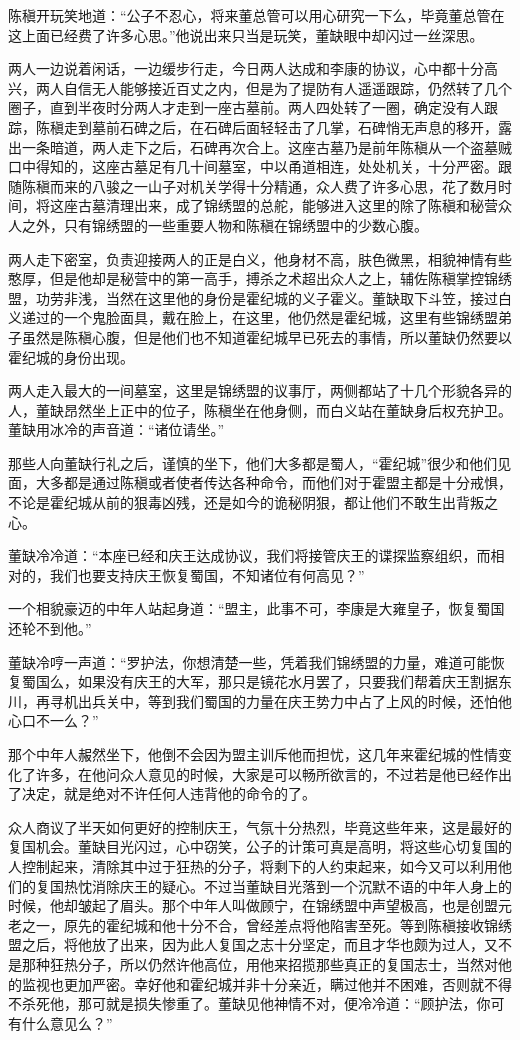 陈稹开玩笑地道：“公子不忍心，将来董总管可以用心研究一下么，毕竟董总管在这上面已经费了许多心思。”他说出来只当是玩笑，董缺眼中却闪过一丝深思。

两人一边说着闲话，一边缓步行走，今日两人达成和李康的协议，心中都十分高兴，两人自信无人能够接近百丈之内，但是为了提防有人遥遥跟踪，仍然转了几个圈子，直到半夜时分两人才走到一座古墓前。两人四处转了一圈，确定没有人跟踪，陈稹走到墓前石碑之后，在石碑后面轻轻击了几掌，石碑悄无声息的移开，露出一条暗道，两人走下之后，石碑再次合上。这座古墓乃是前年陈稹从一个盗墓贼口中得知的，这座古墓足有几十间墓室，中以甬道相连，处处机关，十分严密。跟随陈稹而来的八骏之一山子对机关学得十分精通，众人费了许多心思，花了数月时间，将这座古墓清理出来，成了锦绣盟的总舵，能够进入这里的除了陈稹和秘营众人之外，只有锦绣盟的一些重要人物和陈稹在锦绣盟中的少数心腹。

两人走下密室，负责迎接两人的正是白义，他身材不高，肤色微黑，相貌神情有些憨厚，但是他却是秘营中的第一高手，搏杀之术超出众人之上，辅佐陈稹掌控锦绣盟，功劳非浅，当然在这里他的身份是霍纪城的义子霍义。董缺取下斗笠，接过白义递过的一个鬼脸面具，戴在脸上，在这里，他仍然是霍纪城，这里有些锦绣盟弟子虽然是陈稹心腹，但是他们也不知道霍纪城早已死去的事情，所以董缺仍然要以霍纪城的身份出现。

两人走入最大的一间墓室，这里是锦绣盟的议事厅，两侧都站了十几个形貌各异的人，董缺昂然坐上正中的位子，陈稹坐在他身侧，而白义站在董缺身后权充护卫。董缺用冰冷的声音道：“诸位请坐。”

那些人向董缺行礼之后，谨慎的坐下，他们大多都是蜀人，“霍纪城”很少和他们见面，大多都是通过陈稹或者使者传达各种命令，而他们对于霍盟主都是十分戒惧，不论是霍纪城从前的狠毒凶残，还是如今的诡秘阴狠，都让他们不敢生出背叛之心。

董缺冷冷道：“本座已经和庆王达成协议，我们将接管庆王的谍探监察组织，而相对的，我们也要支持庆王恢复蜀国，不知诸位有何高见？”

一个相貌豪迈的中年人站起身道：“盟主，此事不可，李康是大雍皇子，恢复蜀国还轮不到他。”

董缺冷哼一声道：“罗护法，你想清楚一些，凭着我们锦绣盟的力量，难道可能恢复蜀国么，如果没有庆王的大军，那只是镜花水月罢了，只要我们帮着庆王割据东川，再寻机出兵关中，等到我们蜀国的力量在庆王势力中占了上风的时候，还怕他心口不一么？”

那个中年人赧然坐下，他倒不会因为盟主训斥他而担忧，这几年来霍纪城的性情变化了许多，在他问众人意见的时候，大家是可以畅所欲言的，不过若是他已经作出了决定，就是绝对不许任何人违背他的命令的了。

众人商议了半天如何更好的控制庆王，气氛十分热烈，毕竟这些年来，这是最好的复国机会。董缺目光闪过，心中窃笑，公子的计策可真是高明，将这些心切复国的人控制起来，清除其中过于狂热的分子，将剩下的人约束起来，如今又可以利用他们的复国热忱消除庆王的疑心。不过当董缺目光落到一个沉默不语的中年人身上的时候，他却皱起了眉头。那个中年人叫做顾宁，在锦绣盟中声望极高，也是创盟元老之一，原先的霍纪城和他十分不合，曾经差点将他陷害至死。等到陈稹接收锦绣盟之后，将他放了出来，因为此人复国之志十分坚定，而且才华也颇为过人，又不是那种狂热分子，所以仍然许他高位，用他来招揽那些真正的复国志士，当然对他的监视也更加严密。幸好他和霍纪城并非十分亲近，瞒过他并不困难，否则就不得不杀死他，那可就是损失惨重了。董缺见他神情不对，便冷冷道：“顾护法，你可有什么意见么？”

